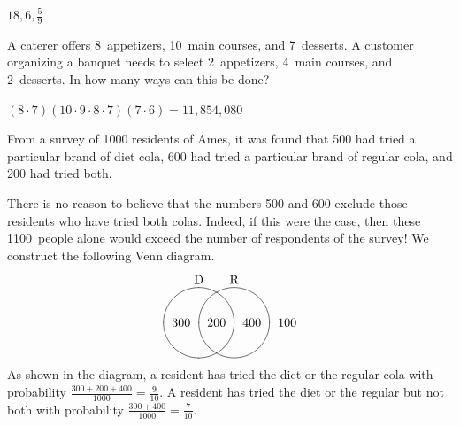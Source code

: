 \documentclass[12pt]{exam}
\begin{document}
\begin{questions}
\begin{solution} $18,6,\frac{5}{9}$\end{solution}

\question A caterer offers 8~appetizers,
10~main courses, and 7~desserts. A customer organizing
a banquet needs to select 2~appetizers, 4~main courses,
and 2~desserts. In how many ways can this be done?
\begin{solution} $\left(8\cdot 7\right)\left(10\cdot
9\cdot 8\cdot 7\right)\left(7\cdot 6\right)=11,854,080$
\end{solution}

\question From a survey of 1000 residents of Ames, it was found that
500 had tried a particular brand of diet cola, 600 had tried
a particular brand of regular cola, and 200 had tried both.
\begin{solution}
There is no reason to believe that the numbers 500 and 600
exclude those residents who have tried both colas. Indeed,
if this were the case, then these 1100~people alone would exceed
the number of respondents of the survey! We construct the following
Venn diagram.
\[\begin{xy}<.5cm,0cm>:
(-1,2)*+!D{\text{D}};
(1,2)*+!D{\text{R}};
(-1,0)*\cir<1cm>{};
(1,0)*\cir<1cm>{};
(0,0)*{200};
(-2,0)*{300};
(2,0)*{400};
(4,0)*{100};
\end{xy}\]
As shown in the diagram, a resident has tried
the diet or the regular cola with probability
$\frac{300+200+400}{1000}=\frac{9}{10}$.
A resident has tried the diet or the regular
but not both with probability
$\frac{300+400}{1000}=\frac{7}{10}$.
\end{solution}


\end{questions}
\end{document}
